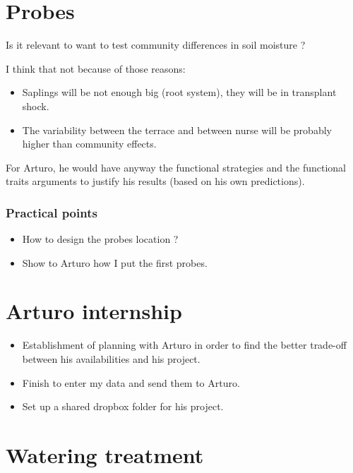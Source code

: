 \documentclass[12pt]{article} %
\begin{document}
\section{Probes}
\label{sec:probes}

Is it relevant to want to test community differences in soil moisture ?

I think that not because of those reasons:

\begin{itemize}
	\item Saplings will be not enough big (root system), they will be in transplant shock.
	\item The variability between the terrace and between nurse will be probably higher than community effects.
		
\end{itemize}

For Arturo, he would have anyway the functional strategies and the functional traits arguments to justify his results (based on his own predictions).

\subsubsection{Practical points}
\label{ssub:}

\begin{itemize}
	\item How to design the probes location ?
	\item Show to Arturo how I put the first probes.
\end{itemize}

\section{Arturo internship}
\label{sec:arturo_internship}

\begin{itemize}
	\item Establishment of planning with Arturo in order to find the better trade-off between his availabilities and his project.
	\item Finish to enter my data and send them to Arturo.
	\item Set up a shared dropbox folder for his project.
	
\end{itemize}

\section{Watering treatment}
\label{sec:}
\end{document}
